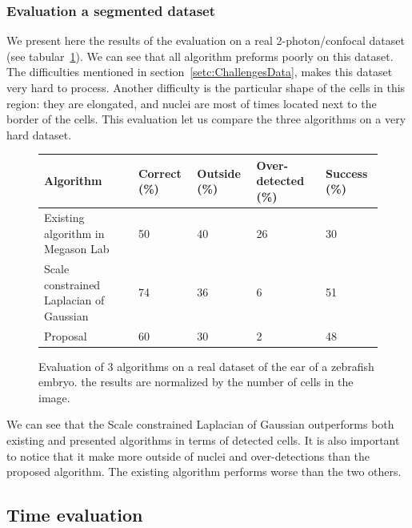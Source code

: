 \subsubsection{Evaluation a segmented dataset}

We present here the results of the evaluation on a real 2-photon/confocal dataset (see tabular~\ref{tab:realEval}). We can see that all algorithm preforms poorly on this dataset.
The difficulties mentioned in section~\ref{setc:ChallengesData}, makes this dataset very hard to process. Another difficulty is the particular shape of the cells in this region: they are elongated, and nuclei are most of times located next to the border of the cells.
This evaluation let us compare the three algorithms on a very hard dataset.
\begin{figure}[htb]
\begin{center}
\begin{tabular}{|p{2.5cm}|l|l|p{1.3cm}|l|}
\hline Algorithm & Correct (\%) & Outside (\%) & Over-detected (\%) & Success (\%) \\ 
\hline Existing algorithm in Megason Lab & 50 & 40 & 26 & 30 \\ 
\hline Scale constrained Laplacian of Gaussian &  74 & 36 & 6 & 51 \\ 
\hline Proposal & 60 & 30 & 2 & 48 \\
\hline
\end{tabular}
\end{center}
\caption{Evaluation of 3 algorithms on a real dataset of the ear of a zebrafish embryo. the results are normalized by the number of cells in the image.}
\label{tab:realEval}
\end{figure}

We can see that the Scale constrained Laplacian of Gaussian outperforms both existing and presented algorithms in terms of detected cells.
It is also important to notice that it make more outside of nuclei and over-detections than the proposed algorithm.
The existing algorithm performs worse than the two others.


\subsection{Time evaluation}


